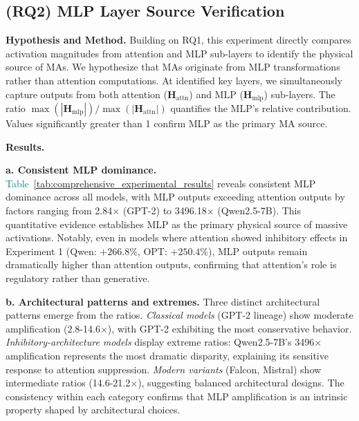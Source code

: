 \documentclass[conference]{IEEEtran}
\begin{document}
\vspace{0.5em}
\noindent{}
\vspace{0.5em}

\subsection{(RQ2) MLP Layer Source Verification}
\label{sec:RQ2}

\noindent\textbf{Hypothesis and Method.}
Building on RQ1, this experiment directly compares activation magnitudes from attention and MLP sub-layers to identify the physical source of MAs. We hypothesize that MAs originate from MLP transformations rather than attention computations. At identified key layers, we simultaneously capture outputs from both attention ($\mathbf{H}_{\text{attn}}$) and MLP ($\mathbf{H}_{\text{mlp}}$) sub-layers. The ratio $\max(|\mathbf{H}_{\text{mlp}}|)/\max(|\mathbf{H}_{\text{attn}}|)$ quantifies the MLP's relative contribution. Values significantly greater than 1 confirm MLP as the primary MA source.

\smallskip
\noindent\textbf{Results.}

\smallskip
\noindent\textbf{a. Consistent MLP dominance.}
\textcolor{teal}{Table~\ref{tab:comprehensive_experimental_results}} reveals consistent MLP dominance across all models, with MLP outputs exceeding attention outputs by factors ranging from 2.84$\times$ (GPT-2) to 3496.18$\times$ (Qwen2.5-7B). This quantitative evidence establishes MLP as the primary physical source of massive activations. Notably, even in models where attention showed inhibitory effects in Experiment 1 (Qwen: $+266.8\%$, OPT: $+250.4\%$), MLP outputs remain dramatically higher than attention outputs, confirming that attention's role is regulatory rather than generative.

\smallskip
\noindent\textbf{b. Architectural patterns and extremes.}
Three distinct architectural patterns emerge from the ratios. \textit{Classical models} (GPT-2 lineage) show moderate amplification (2.8-14.6$\times$), with GPT-2 exhibiting the most conservative behavior. \textit{Inhibitory-architecture models} display extreme ratios: Qwen2.5-7B's 3496$\times$ amplification represents the most dramatic disparity, explaining its sensitive response to attention suppression. \textit{Modern variants} (Falcon, Mistral) show intermediate ratios (14.6-21.2$\times$), suggesting balanced architectural designs. The consistency within each category confirms that MLP amplification is an intrinsic property shaped by architectural choices.
\end{document}
